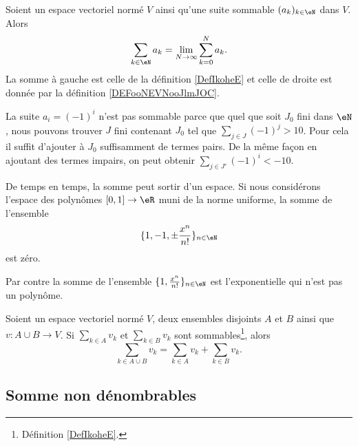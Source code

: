 \begin{lemma}       \label{LEMooGXPGooZTJPoN}
    Soient un espace vectoriel normé \( V\) ainsi qu'une suite sommable \( (a_k)_{k\in \eN}\) dans \( V\). Alors
	\begin{equation}
		\sum_{k\in \eN}a_k=\lim_{N\to \infty} \sum_{k=0}^N a_k.
	\end{equation}
	La somme à gauche est celle de la définition \ref{DefIkoheE} et celle de droite est donnée par la définition \ref{DEFooNEVNooJlmJOC}.
\end{lemma}

\begin{example}
	La suite \( a_i=(-1)^i\) n'est pas sommable parce que quel que soit \( J_0\) fini dans \( \eN\), nous pouvons trouver \( J\) fini contenant \( J_0\) tel que \( \sum_{j\in J}(-1)^j>10\). Pour cela il suffit d'ajouter à \( J_0\) suffisamment de termes pairs. De la même façon en ajoutant des termes impairs, on peut obtenir \( \sum_{j\in J'}(-1)^i<-10\).
\end{example}

\begin{example}
	De temps en temps, la somme peut sortir d'un espace. Si nous considérons l'espace des polynômes \( \mathopen[ 0 , 1 \mathclose]\to \eR\) muni de la norme uniforme, la somme de l'ensemble
	\begin{equation}
		\{ 1,-1,\pm\frac{ x^n }{ n! } \}_{n\in \eN}
	\end{equation}
	est zéro.

	Par contre la somme de l'ensemble \( \{ 1,\frac{ x^n }{ n! } \}_{n\in \eN}\) est l'exponentielle qui n'est pas un polynôme.
\end{example}

\begin{proposition}      \label{PROPooJLQAooAEbIvZ}
	Soient un espace vectoriel normé \( V\), deux ensembles disjoints \( A\) et \( B\) ainsi que \( v\colon A\cup B\to V\). Si \( \sum_{k\in A}v_k\) et \( \sum_{k\in B}v_k\) sont sommables\footnote{Définition \ref{DefIkoheE}.}, alors
	\begin{equation}
		\sum_{k\in A\cup B}v_k=\sum_{k\in A}v_k+\sum_{k\in B}v_k.
	\end{equation}
\end{proposition}

\subsection{Somme non dénombrables}

